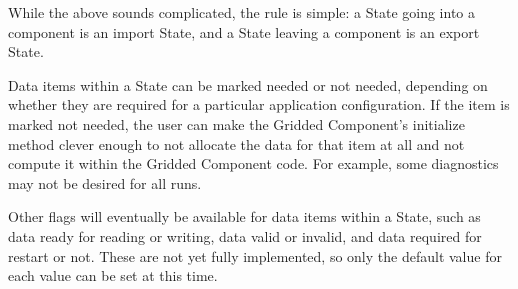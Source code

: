 While the above sounds complicated, the rule is simple:
a State going into a component is an import State, and a 
State leaving a component is an export State.

Data items within a State can be marked needed or not needed,
depending on whether they are required for a particular 
application configuration.  If the item is marked not needed,
the user can make the Gridded Component's initialize method 
clever enough to not allocate the data for that item at all
and not compute it within the Gridded Component code.
For example, some diagnostics may not be desired for all 
runs.

Other flags will eventually be available for data items within 
a State, such as data ready for reading or writing, data valid or 
invalid, and data required for restart or not.  These are not
yet fully implemented, so only the default value for each value 
can be set at this time.





